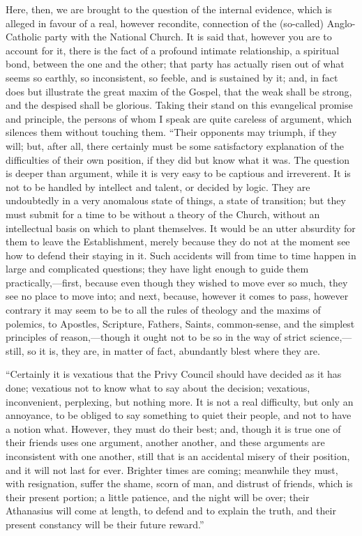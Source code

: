 Here, then, we are brought to the question of the internal
evidence, which is alleged in favour of a real, however recondite,
connection of the (so-called) Anglo-Catholic party with the National
Church. It is said that, however you are to account for it, there is
the fact of a profound intimate relationship, a spiritual bond,
between the one and the other; that party has actually risen out of
what seems so earthly, so inconsistent, so feeble, and is sustained by
it; and, in fact does but illustrate the great maxim of the Gospel,
that the weak shall be strong, and the despised shall be glorious.
Taking their stand on this evangelical promise and principle, the
persons of whom I speak are quite careless of argument, which silences
them without touching them. ``Their opponents may triumph, if they
will; but, after all, there certainly must be some satisfactory
explanation of the difficulties of their own position, if they did but
know what it was. The question is deeper than argument, while it is
very easy to be captious and irreverent. It is not to be handled by
intellect and talent, or decided by logic. They are undoubtedly in a
very anomalous state of things, a state of transition; but they must
submit for a time to be without a theory of the Church, without an
intellectual basis on which to plant themselves. It would be an utter
absurdity for them to leave the Establishment, merely because they do
not at the moment see how to defend their staying in it. Such
accidents will from time to time happen in large and complicated
questions; they have light enough to guide them practically,—first,
because even though they wished to move ever so much, they see no
place to move into; and next, because, however it comes to pass,
however contrary it may seem to be to all the rules of theology and
the maxims of polemics, to Apostles, Scripture, Fathers, Saints,
common-sense, and the simplest principles of reason,—though it ought
not to be so in the way of strict science,—still, so it is, they
are, in matter of fact, abundantly blest where they are.

``Certainly it is vexatious that the Privy Council should have
decided as it has done; vexatious not to know what to say about the
decision; vexatious, inconvenient, perplexing, but nothing more. It is
not a real difficulty, but only an annoyance, to be obliged to say
something to quiet their people, and not to have a notion what.
However, they must do their best; and, though it is true one of their
friends uses one argument, another another, and these arguments are
inconsistent with one another, still that is an accidental misery of
their position, and it will not last for ever. Brighter times are
coming; meanwhile they must, with resignation, suffer the shame, scorn
of man, and distrust of friends, which is their present portion; a
little patience, and the night will be over; their Athanasius will
come at length, to defend and to explain the truth, and their present
constancy will be their future reward.''

